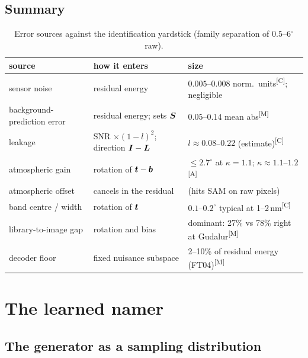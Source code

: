 \documentclass[11pt,a4paper]{article}
\theoremstyle{plain}
\theoremstyle{definition}
\theoremstyle{remark}
\newcommand{\bvec}{\B{b}}
\newcommand{\tv}{\B{t}}
\newcommand{\Sm}{\B{S}}
\newcommand{\Lm}{\B{L}}
\newcommand{\Id}{\B{I}}
\newcommand{\meas}{\textsuperscript{\textsf{\scriptsize[M]}}}
\newcommand{\comp}{\textsuperscript{\textsf{\scriptsize[C]}}}
\newcommand{\assm}{\textsuperscript{\textsf{\scriptsize[A]}}}
\begin{document}
\subsection{Summary}

\begin{table}[ht]
\centering\small
\caption{Error sources against the identification yardstick (family separation of $0.5$--$6^\circ$ raw).}
\label{tab:errors}
\begin{tabularx}{\textwidth}{@{}lXl@{}}
\toprule
source & how it enters & size\\
\midrule
sensor noise & residual energy & $0.005$--$0.008$ norm.\ units\comp; negligible\\
background-prediction error & residual energy; sets $\Sm$ & $0.05$--$0.14$ mean abs\meas\\
leakage & SNR $\times(1-l)^2$; direction $\Id-\Lm$ & $l\approx0.08$--$0.22$ (estimate)\comp\\
atmospheric gain & rotation of $\tv-\bvec$ & $\le2.7^\circ$ at $\kappa=1.1$; $\kappa\approx1.1$--$1.2$\assm\\
atmospheric offset & cancels in the residual & (hits SAM on raw pixels)\\
band centre / width & rotation of $\tv$ & $0.1$--$0.2^\circ$ typical at 1--2\,nm\comp\\
library-to-image gap & rotation and bias & dominant: 27\% vs 78\% right at Gudalur\meas\\
decoder floor & fixed nuisance subspace & 2--10\% of residual energy (FT04)\meas\\
\bottomrule
\end{tabularx}
\end{table}

\section{The learned namer}
\label{sec:namer}

\subsection{The generator as a sampling distribution}
\end{document}
